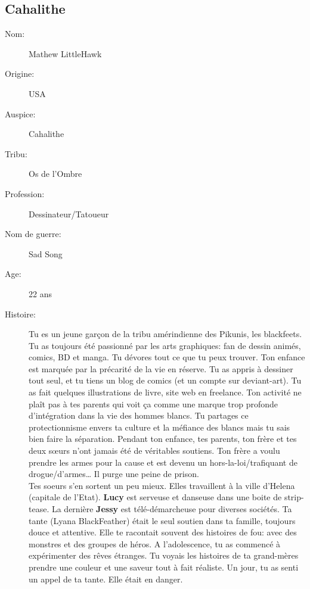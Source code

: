 \documentclass[oneside,12pt]{book}
\begin{document}
\begin{flushleft}
\clearpage
\section{Cahalithe}
\begin{description}
\item[Nom:]{Mathew LittleHawk}
\item[Origine:]{USA}
\item[Auspice:]{Cahalithe}
\item[Tribu:]{Os de l'Ombre}
\item[Profession:]{Dessinateur/Tatoueur}
\item[Nom de guerre:]{Sad Song}
\item[Age:]{22 ans}
\item[Histoire:]{
Tu es un jeune garçon de la tribu amérindienne des Pikunis, les blackfeets. Tu as toujours été passionné par les arts graphiques: fan de dessin animés, comics, BD et manga. Tu dévores tout ce que tu peux trouver.
Ton enfance est marquée par la précarité de la vie en réserve. Tu as appris à dessiner tout seul, et tu tiens un blog de comics (et un compte sur deviant-art). Tu as fait quelques illustrations de livre, site web en
freelance. Ton activité ne plaît pas à tes parents qui voit ça comme une marque trop profonde d'intégration dans la vie des hommes blancs. Tu partages ce protectionnisme envers ta culture et la méfiance des blancs mais tu sais bien faire la séparation.
Pendant ton enfance, tes parents, ton frère et tes deux sœurs n'ont jamais été de véritables soutiens. Ton frère a voulu prendre les armes pour la cause et est devenu un hors-la-loi/trafiquant de drogue/d’armes… Il purge une peine de prison. \\
Tes soeurs s'en sortent un peu mieux. Elles travaillent à la ville d’Helena (capitale de l’Etat). \textbf{Lucy} est serveuse et danseuse dans une boite de strip-tease. La dernière \textbf{Jessy} est télé-démarcheuse pour diverses sociétés.
Ta tante (Lyana BlackFeather) était le seul soutien dans ta famille, toujours douce et attentive. Elle te racontait souvent des histoires de fou: avec des monstres et des groupes de héros. A l’adolescence, tu as commencé à expérimenter des rêves étranges. 
Tu voyais les histoires de ta grand-mères prendre une couleur et une saveur tout à fait réaliste. Un jour, tu as senti un appel de ta tante. Elle était en danger. 
}
\end{description}
\end{flushleft}
\end{document}
